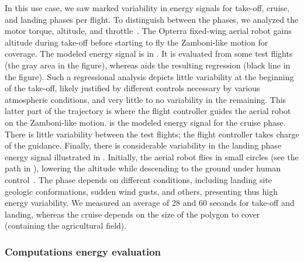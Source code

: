 In this use case, we saw marked variability in energy signals for take-off, cruise, and landing phases per flight. To distinguish between the phases, we analyzed the motor torque, altitude, and throttle~\citep{seewald2020mechanical}. The Opterra fixed-wing aerial robot gains altitude during take-off before starting to fly the Zamboni-like motion for coverage. The modeled energy signal is in . It is evaluated from some test flights (the gray area in the figure), whereas \matlab aids the resulting regression (black line in the figure). Such a regressional analysis depicts little variability at the beginning of the take-off, likely justified by different controls necessary by various atmospheric conditions, and very little to no variability in the remaining. This latter part of the trajectory is where the flight controller guides the aerial robot on the Zamboni-like motion.  is the modeled energy signal for the cruise phase. There is little variability between the test flights; the flight controller takes charge of the guidance. Finally, there is considerable variability in the landing phase energy signal illustrated in . Initially, the aerial robot flies in small circles (see the path in ), lowering the altitude while descending to the ground under human control~\citep{seewald2020mechanical}. The phase depends on different conditions, including landing site geologic conformations, sudden wind gusts, and others, presenting thus high energy variability. We measured an average of 28 and 60 seconds for take-off and landing, whereas the cruise depends on the size of the polygon to cover (containing the agricultural field).

\subsubsection{Computations energy evaluation}

